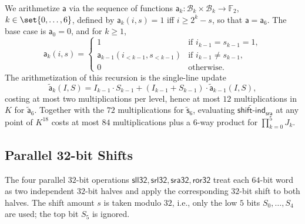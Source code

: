 \documentclass{article}
\theoremstyle{definition}
\newcommand*{\mle}{\widetilde}
\newcommand{\BB}{\mathcal{B}}
\newcommand{\FF}[1]{\mathbb{F}_{#1}}
\begin{document}
We arithmetize $\mathsf{a}$ via the sequence of functions $\mathsf{a}_k \colon \BB_k \times \BB_k \to \FF{2}$, $k \in \set{0, \ldots, 6}$, defined by $\mathsf{a}_k(i, s) = 1$ iff $i \geq 2^k - s$, so that $\mathsf{a} = \mathsf{a}_6$. The base case is $\mathsf{a}_0 = 0$, and for $k \geq 1$,
\[
  \mathsf{a}_k(i, s) = \begin{cases} 1 & \text{if } i_{k - 1} = s_{k - 1} = 1, \\ \mathsf{a}_{k - 1}(i_{<k-1}, s_{<k-1}) & \text{if } i_{k - 1} \neq s_{k - 1}, \\ 0 & \text{otherwise.} \end{cases}
\]
The arithmetization of this recursion is the single-line update
\[
  \mle{\mathsf{a}}_k(I, S) = I_{k - 1} \cdot S_{k - 1} + (I_{k - 1} + S_{k - 1}) \cdot \mle{\mathsf{a}}_{k - 1}(I, S),
\]
costing at most two multiplications per level, hence at most $12$ multiplications in $K$ for $\mle{\mathsf{a}}_6$. Together with the $72$ multiplications for $\mle{\mathsf{s}}_6$, evaluating $\mle{\textsf{shift-ind}}_\textsf{sra}$ at any point of $K^{18}$ costs at most $84$ multiplications plus a $6$-way product for $\prod_{k = 0}^5 J_k$.

\subsection{Parallel 32-bit Shifts}
\label{sec:parallel-32bit-shifts}

The four parallel $32$-bit operations $\textsf{sll32}, \textsf{srl32}, \textsf{sra32}, \textsf{ror32}$ treat each $64$-bit word as two independent $32$-bit halves and apply the corresponding $32$-bit shift to both halves. The shift amount $s$ is taken modulo $32$, i.e., only the low $5$ bits $S_0, \ldots, S_4$ are used; the top bit $S_5$ is ignored.
\end{document}
